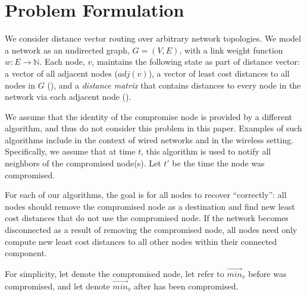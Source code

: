 \section{Problem Formulation}
\label{sec:problem}

We consider distance vector routing \cite{Gall87} over arbitrary network topologies. We model a network as an undirected graph, $G=(V,E)$,
with a link weight function $w: E \rightarrow \mathbb{N}$.
Each node, $v$, maintains the following state as part of distance vector: a vector of all adjacent nodes ($adj(v)$), a vector of least cost distances to all
nodes in $G$ (\minvvs), and a \emph{distance matrix} that contains distances to every node in the network via each adjacent node (\dmatrixvs). 

We assume that the identity of the compromise node is provided by a different algorithm, and thus do not consider this problem in this paper.
Examples of such algorithms include \cite{Arini, Feam, Feldmann}
in the context of wired networks and \cite{Paul02} in the wireless setting. 
Specifically, we assume that at time $t$, this algorithm is used to notify all neighbors of the 
compromised node(s). Let $t'$ be the time the node was compromised.

For each of our algorithms, the goal is for all nodes to recover ``correctly'': all nodes should remove the compromised node as a destination and find
new least cost distances that do not use the compromised node. If the network becomes disconnected as a result of removing the compromised node, all
nodes need only compute new least cost distances to all other nodes within their connected component.

For simplicity, let \bad denote the compromised node, let \oldvector refer to $\overrightarrow{min}_{\overline{v}}$ 
before \bad was compromised, and let \badvector denote $\overrightarrow{min}_{\overline{v}}$ after \bad has been compromised.


